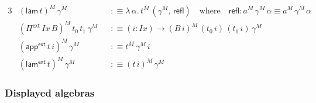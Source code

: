 \documentclass[12pt,a4paper,twoside,openany]{book}
\theoremstyle{remark}
\theoremstyle{definition}
\theoremstyle{theorem}
\newcommand{\mi}[1]{\mathit{#1}}
\newcommand{\ms}[1]{\mathsf{#1}}
\newcommand{\refl}{\mathsf{refl}}
\newcommand{\Pie}{\Pi^{\mathsf{ext}}}
\newcommand{\appe}{\mathsf{app^{ext}}}
\newcommand{\lame}{\mathsf{lam^{ext}}}
\newcommand{\lam}{\ms{lam}}
\newcommand{\defn}{:\equiv}
\begin{document}
\begin{alignat*}{3}
  &(\lam\,t)^M\,\gamma^M &&\defn \lambda\,\alpha.\,t^M\,(\gamma^M,\,\refl)\hspace{1em}\text{where}\hspace{1em} \refl : a^M\,\gamma^M\,\alpha \equiv a^M\,\gamma^M\,\alpha\\
  &(\Pie\,\mi{Ix}\,B)^M\,t_0\,t_1\,\gamma^M &&\defn (i : \mi{Ix}) \to (B\,i)^M\,(t_0\,i)\,(t_1\,i)\,\gamma^M\\
  &(\appe\,t\,i)^M\,\gamma^M &&\defn t^M\,\gamma^M\,i\\
  &(\lame\,t)^M\,\gamma^M &&\defn (t\,i)^M\,\gamma^M
\end{alignat*}

\subsubsection{Displayed algebras}
\end{document}
